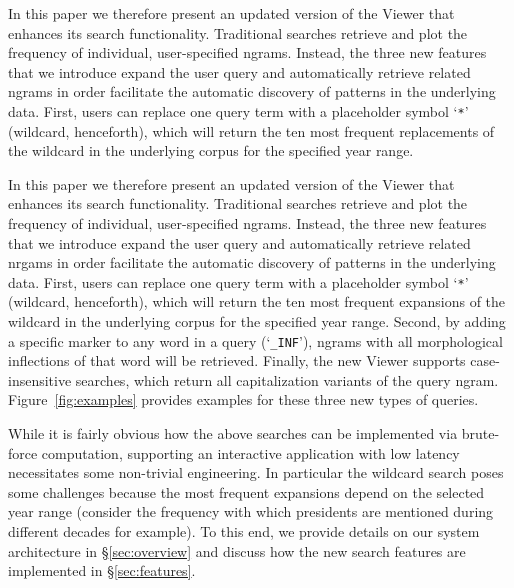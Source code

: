 \documentclass[11pt]{article}
\begin{document}
In this paper we therefore present an updated version of the Viewer that enhances its search functionality. Traditional searches retrieve and plot the frequency of individual, user-specified ngrams. Instead, the three new features that we introduce expand the user query and automatically retrieve related ngrams in order facilitate the automatic discovery of patterns in the underlying data. First, users can replace one query term with a placeholder symbol `\texttt{*}' (wildcard, henceforth), which will return the ten most frequent replacements of the wildcard in the underlying corpus for the specified year range. 

In this paper we therefore present an updated version of the Viewer that enhances its search functionality. Traditional searches retrieve and plot the frequency of individual, user-specified ngrams. Instead, the three new features that we introduce expand the user query and automatically retrieve related nrgams in order facilitate the automatic discovery of patterns in the underlying data. First, users can replace one query term with a placeholder symbol `\texttt{*}' (wildcard, henceforth), which will return the ten most frequent expansions of the wildcard in the underlying corpus for the specified year range. 
Second, by adding a specific marker to any word in a query (`\texttt{\_INF}'), ngrams with all morphological inflections of that word will be retrieved. 
Finally, the new Viewer supports case-insensitive searches, which return all capitalization variants of the query ngram. Figure~\ref{fig:examples} provides examples for these three new types of queries.

While it is fairly obvious how the above searches can be implemented via brute-force computation, supporting an interactive application with low latency necessitates some non-trivial engineering. In particular the wildcard search poses some challenges because the most frequent expansions depend on the selected year range (consider the frequency with which presidents are mentioned during different decades for example). To this end, we provide details on our system architecture in \S\ref{sec:overview}  and discuss how the new search features are implemented in \S\ref{sec:features}.
\end{document}
